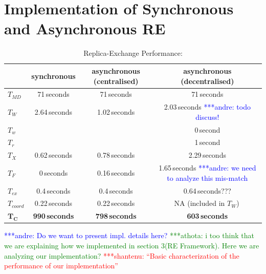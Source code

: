 \documentclass{rspublic}
\newcommand{\jhanote}[1]{ {\textcolor{red} { ***shantenu: #1 }}}
\newcommand{\alnote}[1]{ {\textcolor{blue} { ***andre: #1 }}}
\newcommand{\athotanote}[1]{ {\textcolor{green} { ***athota: #1 }}}
\newcommand{\alnote}[1]{}
\newcommand{\athotanote}[1]{}
\newcommand{\jhanote}[1]{}
\begin{document}
\section{Implementation of Synchronous and Asynchronous RE}
\label{sec:re_impl}

\begin{table}
    \centering
	\begin{tabular}{|l|c|c|c|}
	\hline
	                        &synchronous  &asynchronous (centralised) &asynchronous (decentralised)\\
	\hline
	$T_{MD}$       &71\,seconds &71\,seconds &71\,seconds\\
	\hline
	\hline
	$T_{W}$        &2.64\,seconds &1.02\,seconds &2.03\,seconds\alnote{todo discuss!}\\
	\hline
	\hspace{2mm}$T_{w}$ &&&0\,second\\ 
	\hline
	\hspace{2mm}$T_{r}$ &&&1\,second\\
	\hline\hline
	$T_{X}$        &0.62\,seconds &0.78\,seconds &2.29\,seconds\\
	\hline
	\hspace{2mm}$T_{F}$        &0\,seconds   &0.16\,seconds &1.65\,seconds \alnote{we need to analyze this mis-match}\\
	\hline
	\hspace{2mm}$T_{ex}$       &0.4\,seconds &0.4\,seconds &0.64\,seconds???\\
	\hline
    \hspace{2mm}$T_{coord}$    &0.22\,seconds &0.22\,seconds    &NA (included in $T_W$)\,\\
	\hline
	\hline
	$\mathbf{T_{C}}$        &\textbf{990\,seconds} &\textbf{798\,seconds}    &\textbf{603\,seconds}\\
	\hline
    \end{tabular}
	\caption{Replica-Exchange Performance:}
	\label{table:repex_perf}
\end{table}

\alnote{Do we want to present impl. details here?}  \athotanote{i too
  think that we are explaining how we implemented in section 3(RE
  Framework). Here we are analyzing our implementation?}
\jhanote{``Basic characterization of the performance of our implementation''}
\end{document}
